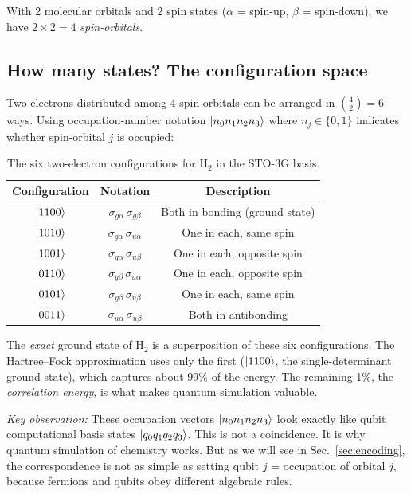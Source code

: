 \documentclass[aps,prb,preprint,longbibliography,nofootinbib]{revtex4-2}
\begin{document}
With 2 molecular orbitals and 2 spin states ($\alpha$ = spin-up,
$\beta$ = spin-down), we have $2 \times 2 = 4$ \emph{spin-orbitals}.

\subsection{How many states?  The configuration space}

Two electrons distributed among 4 spin-orbitals can be arranged in
$\binom{4}{2} = 6$ ways.  Using occupation-number notation
$\ket{n_0 n_1 n_2 n_3}$ where $n_j \in \{0,1\}$ indicates whether
spin-orbital $j$ is occupied:

\begin{table}[h]
\centering
\begin{tabular}{@{}ccc@{}}
\toprule
\textbf{Configuration} & \textbf{Notation} & \textbf{Description} \\
\midrule
$\ket{1100}$ & $\sigma_{g\alpha}\, \sigma_{g\beta}$
  & Both in bonding (ground state) \\
$\ket{1010}$ & $\sigma_{g\alpha}\, \sigma_{u\alpha}$
  & One in each, same spin \\
$\ket{1001}$ & $\sigma_{g\alpha}\, \sigma_{u\beta}$
  & One in each, opposite spin \\
$\ket{0110}$ & $\sigma_{g\beta}\, \sigma_{u\alpha}$
  & One in each, opposite spin \\
$\ket{0101}$ & $\sigma_{g\beta}\, \sigma_{u\beta}$
  & One in each, same spin \\
$\ket{0011}$ & $\sigma_{u\alpha}\, \sigma_{u\beta}$
  & Both in antibonding \\
\bottomrule
\end{tabular}
\caption{The six two-electron configurations for H$_2$ in the STO-3G basis.}
\label{tab:configurations}
\end{table}

The \emph{exact} ground state of H$_2$ is a superposition of these six
configurations.  The Hartree--Fock approximation uses only the first
($\ket{1100}$, the single-determinant ground state), which captures
about 99\% of the energy.  The remaining 1\%, the \emph{correlation
energy}, is what makes quantum simulation valuable.

\emph{Key observation:}  These occupation vectors
$\ket{n_0 n_1 n_2 n_3}$ look exactly like qubit computational basis
states $\ket{q_0 q_1 q_2 q_3}$.  This is not a coincidence.  It is why
quantum simulation of chemistry works.  But as we will see in
Sec.~\ref{sec:encoding}, the correspondence is not as simple as setting
qubit $j$ = occupation of orbital $j$, because fermions and qubits obey
different algebraic rules.
\end{document}
